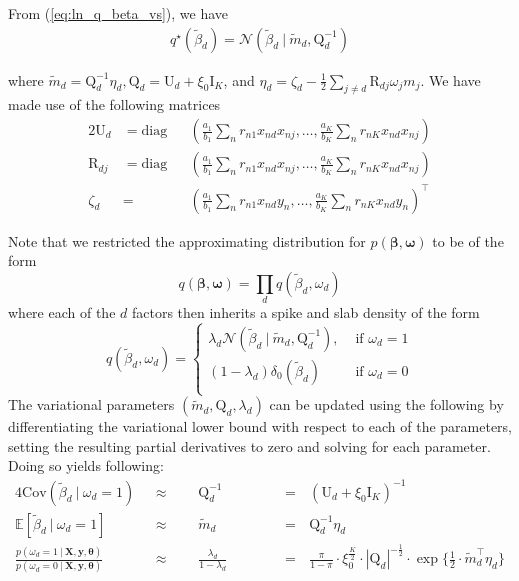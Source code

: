 \documentclass[twoside,11pt]{article}
\newcommand\given[1][]{\:#1\vert\:}
\newcommand{\transpose}[1]{#1^{\intercal}}
\newcommand{\nsum}{\sum\limits_{n}}
\newcommand{\boldbeta}{\boldsymbol\beta}
\newcommand{\E}{\mathbb{E}}
\newcommand{\betad}{\tilde{\beta}_d}
\newcommand{\umat}{\mathrm{U}}
\newcommand{\qmat}{\mathrm{Q}}
\newcommand{\pr}[1]{p \left( #1 \right)}
\begin{document}
From (\ref{eq:ln_q_beta_vs}), we have
\begin{align*}
	q^{\star}(\betad) = \mathcal{N} \left( \betad \given \tilde{m}_d, \qmat_d^{-1} \right)
\end{align*}

where $\tilde{m}_d = \qmat_d^{-1} \eta_d, \qmat_d = \umat_d + \xi_0 \mathrm{I}_K$, and $\eta_d = \zeta_d - \frac{1}{2} \sum\limits_{j \neq d} \mathrm{R}_{dj} \omega_j m_j$. We have made use of the following matrices
\begin{alignat}{2}
	\umat_d &= \mathrm{diag} &&\left(\frac{a_1}{b_1} \nsum r_{n1} x_{nd}x_{nj}, \ldots, \frac{a_K}{b_K} \nsum r_{nK} x_{nd}x_{nj} \right) \\
	\mathrm{R}_{dj} &= \mathrm{diag} &&\left(\frac{a_1}{b_1} \nsum r_{n1} x_{nd}x_{nj}, \ldots, \frac{a_K}{b_K} \nsum r_{nK} x_{nd}x_{nj} \right) \\
	\zeta_d &= &&\transpose{\left( \frac{a_1}{b_1} \nsum r_{n1} x_{nd}y_{n}, \ldots, \frac{a_K}{b_K} \nsum r_{nK} x_{nd}y_{n} \right)}
\end{alignat}



Note that we restricted the approximating distribution for $\pr{\boldbeta, \boldsymbol\omega}$ to be of the form
$$ q \left( \boldbeta, \boldsymbol \omega\right) = \prod_{d} q \left( \betad, \omega_d \right) $$
where each of the $d$ factors then inherits a spike and slab density of the form
\[   
q \left( \betad, \omega_d \right) = 
\left\{
\begin{array}{ll}
      \lambda_d \mathcal{N} \left( \betad \given \tilde{m}_d, \qmat_d^{-1} \right),  & \textrm{ if } \omega_d = 1 \\
      (1 - \lambda_d) \delta_0 \left( \betad \right) & \textrm{ if } \omega_d = 0 \\
\end{array} 
\right. \]
The variational parameters $(\tilde{m}_d, \qmat_d, \lambda_d)$ can be updated using the following by differentiating the variational lower bound with respect to each of the parameters, setting the resulting partial derivatives to zero and solving for each parameter. Doing so yields following:
\setlength{\jot}{10pt}
\begin{alignat}{4}
  \mathrm{Cov}(\betad \given \omega_d = 1) \textrm{ } &\approx \textrm{ }&& \qmat_d^{-1} &&\textrm{ } & &= \textrm{ } \left(\umat_d + \xi_0 \mathrm{I}_K\right)^{-1} \label{eq:var_betad}\\
  \E [ \betad \given \omega_d = 1]  \textrm{ }&\approx \textrm{ } && \tilde{m}_d &&\textrm{ }& &= \textrm{ } \qmat_d^{-1} \eta_d  \label{eq:e_betad}\\
  \frac{\pr{\omega_d = 1\given \mathbf{X}, \mathbf{y}, \boldsymbol\theta}}{\pr{\omega_d = 0 \given \mathbf{X}, \mathbf{y}, \boldsymbol\theta}} \textrm{ } &\approx \textrm{ } && \frac{\lambda_d}{1-\lambda_d}&& \textrm{ }& &= \textrm{ } \frac{\pi}{1-\pi} \cdot \xi_0^{\frac{K}{2}} \cdot |\qmat_d|^{-\frac{1}{2}}\cdot \exp\Big\{\frac{1}{2} \cdot \transpose{\tilde{m}_d}\eta_d\Big\} \label{eq:logodds_lambda}
\end{alignat}
\end{document}
